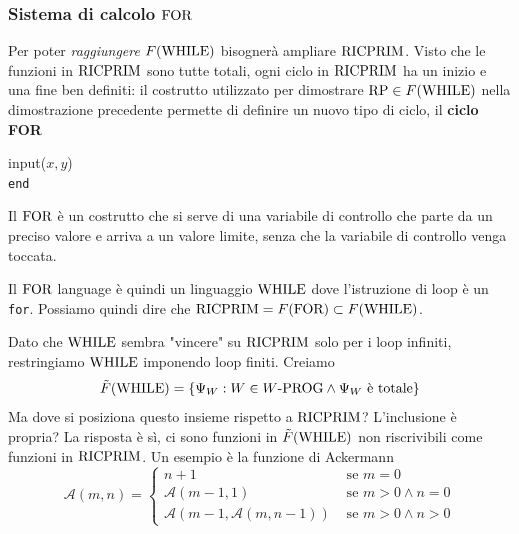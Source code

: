 \subsubsection{Sistema di calcolo $\text{FOR}$}

Per poter \textit{raggiungere} $F(\text{WHILE})$ bisognerà ampliare $\text{RICPRIM}$. Visto che le funzioni in $\text{RICPRIM}$ sono tutte totali, ogni ciclo in $\text{RICPRIM}$ ha un inizio e una fine ben definiti: il costrutto utilizzato per dimostrare $\text{RP} \in F(\text{WHILE})$ nella dimostrazione precedente permette di definire un nuovo tipo di ciclo, il \textbf{ciclo FOR}
\begin{center}
	\begin{minipage}{.85\textwidth}
		\begin{tcolorbox}[colback=white,sharp corners,boxrule=.3mm]
			\begin{algorithm}[H]
				\SetAlgoNoEnd
				input($x,y$) \\
				\texttt{end}
			\end{algorithm}
		\end{tcolorbox} 
	\end{minipage}
\end{center}

Il $\text{FOR}$ è un costrutto che si serve di una variabile di controllo che parte da un preciso valore e arriva a un valore limite, senza che la variabile di controllo venga toccata.

Il $\text{FOR}$ language è quindi un linguaggio $\text{WHILE}$ dove l'istruzione di loop è un \texttt{for}. Possiamo quindi dire che $\text{RICPRIM} = F(\text{FOR}) \subset F(\text{WHILE})$.

Dato che $\text{WHILE}$ sembra "vincere" su $\text{RICPRIM}$ solo per i loop infiniti, restringiamo $\text{WHILE}$ imponendo loop finiti. Creiamo
$$ \tilde F (\text{WHILE}) = \{ \Psi_W: W \in W\text{-PROG} \wedge \Psi_W \text{ è totale}\}$$
Ma dove si posiziona questo insieme rispetto a $\text{RICPRIM}$? L'inclusione è propria? La risposta è sì, ci sono funzioni in $\tilde F (\text{WHILE})$ non riscrivibili come funzioni in $\text{RICPRIM}$. Un esempio è la funzione di Ackermann
$$ 
\mathcal{A} (m,n) = \begin{cases}
	n + 1 & \text{ se } m = 0 \\
	\mathcal{A}(m-1, 1) & \text{ se } m > 0 \wedge n = 0 \\
	\mathcal{A}(m-1, \mathcal{A}(m, n-1)) & \text{ se } m > 0 \wedge n > 0
\end{cases}
$$

